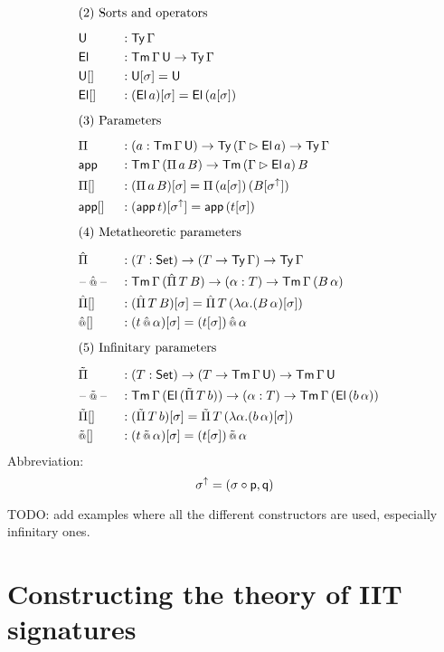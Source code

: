 \documentclass[a4paper,UKenglish,cleveref, autoref]{lipics-v2019}
\begin{document}
\begin{alignat*}{5}
  & \rlap{(2) Sorts and operators} \\[0.5em]
  & \U && : \Ty\,\Gamma \\
  & \El && : \Tm\,\Gamma\,\U\ra\Ty\,\Gamma \\
  & {\U[]} && : \U[\sigma] = \U \\
  & {\El[]} && : (\El\,a)[\sigma] = \El\,(a[\sigma]) \\[0.5em]
  & \rlap{(3) Parameters} \\[0.5em]
  & \Pi && : (a:\Tm\,\Gamma\,\U)\ra\Ty\,(\Gamma\ext\El\,a)\ra\Ty\,\Gamma \\
  & \app && : \Tm\,\Gamma\,(\Pi\,a\,B)\ra\Tm\,(\Gamma\ext \El\,a)\,B \\
  & {\Pi[]} && : (\Pi\,a\,B)[\sigma] = \Pi\,(a[\sigma])\,(B[\sigma^\uparrow]) \\
  & {\app[]} && : (\app\,t)[\sigma^\uparrow] = \app\,(t[\sigma]) \\[0.5em]
  & \rlap{(4) Metatheoretic parameters} \\[0.5em]
  & \Pim && : (T:\Set)\ra(T\ra\Ty\,\Gamma)\ra\Ty\,\Gamma \\
  & \blank\appm \blank && : \Tm\,\Gamma\,(\Pim\,T\,B)\ra(\alpha:T) \ra\Tm\,\Gamma\,(B\,\alpha) \\
  & {\Pim[]} && : (\Pim\,T\,B)[\sigma] = \Pim\,T\,(\lambda \alpha.(B\,\alpha)[\sigma]) \\
  & {\appm[]} && : (t\appm\alpha)[\sigma] = (t[\sigma])\mathop{\appm}\alpha \\[0.5em]
  & \rlap{(5) Infinitary parameters} \\[0.5em]
  & \Pii && : (T:\Set)\ra(T\ra\Tm\,\Gamma\,\U)\ra\Tm\,\Gamma\,\U \\
  & \blank\appi\blank && : \Tm\,\Gamma\,(\El\,(\Pii\,T\,b))\ra(\alpha:T)\ra\Tm\,\Gamma\,(\El\,(b\,\alpha)) \\
  & {\Pii[]} && : (\Pii\,T\,b)[\sigma] = \Pii\,T\,(\lambda \alpha.(b\,\alpha)[\sigma]) \\
  & {\appi[]} && : (t\appi\alpha)[\sigma] = (t[\sigma])\mathop{\appi}\alpha
\end{alignat*}
Abbreviation:
\[
  \sigma^\uparrow = (\sigma\circ\mathsf{p},\mathsf{q})
\]

TODO: add examples where all the different constructors are used,
especially infinitary ones.

\section{Constructing the theory of IIT signatures}
\label{sec:ambroise}
\end{document}

